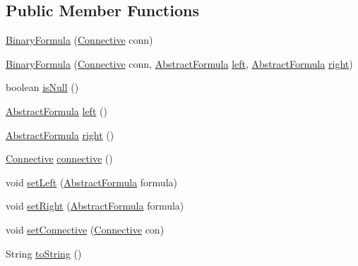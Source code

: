 \subsection*{Public Member Functions}
\begin{DoxyCompactItemize}
\item 
\hyperlink{classuran_1_1formula_1_1_binary_formula_a02edc9bf8395074ae45d67417c26fc7d}{Binary\+Formula} (\hyperlink{enumuran_1_1formula_1_1_connective}{Connective} conn)
\item 
\hyperlink{classuran_1_1formula_1_1_binary_formula_a051fd65931e106b7d90aac73fff959d8}{Binary\+Formula} (\hyperlink{enumuran_1_1formula_1_1_connective}{Connective} conn, \hyperlink{classuran_1_1formula_1_1_abstract_formula}{Abstract\+Formula} \hyperlink{classuran_1_1formula_1_1_binary_formula_aca2f2d393214c782821c830525e2eba0}{left}, \hyperlink{classuran_1_1formula_1_1_abstract_formula}{Abstract\+Formula} \hyperlink{classuran_1_1formula_1_1_binary_formula_ad4643ee331c73078ccb8e7588db42469}{right})
\item 
boolean \hyperlink{classuran_1_1formula_1_1_binary_formula_ae398153453e6ae20cd6f643f189a87bb}{is\+Null} ()
\item 
\hyperlink{classuran_1_1formula_1_1_abstract_formula}{Abstract\+Formula} \hyperlink{classuran_1_1formula_1_1_binary_formula_aca2f2d393214c782821c830525e2eba0}{left} ()
\item 
\hyperlink{classuran_1_1formula_1_1_abstract_formula}{Abstract\+Formula} \hyperlink{classuran_1_1formula_1_1_binary_formula_ad4643ee331c73078ccb8e7588db42469}{right} ()
\item 
\hyperlink{enumuran_1_1formula_1_1_connective}{Connective} \hyperlink{classuran_1_1formula_1_1_binary_formula_ab1b44bdcdb9c9c287d5e073f397b7139}{connective} ()
\item 
void \hyperlink{classuran_1_1formula_1_1_binary_formula_ae6ce97787a6685a6924bc280116b5908}{set\+Left} (\hyperlink{classuran_1_1formula_1_1_abstract_formula}{Abstract\+Formula} formula)
\item 
void \hyperlink{classuran_1_1formula_1_1_binary_formula_ad68d13b744b4dfa52baca70c23a0e43e}{set\+Right} (\hyperlink{classuran_1_1formula_1_1_abstract_formula}{Abstract\+Formula} formula)
\item 
void \hyperlink{classuran_1_1formula_1_1_binary_formula_ab35c22ba91aa5a0b93a970bc59cfa265}{set\+Connective} (\hyperlink{enumuran_1_1formula_1_1_connective}{Connective} con)
\item 
String \hyperlink{classuran_1_1formula_1_1_binary_formula_a63a533db1d7231013b39aabbb13a9ed1}{to\+String} ()

\end{DoxyCompactItemize}
